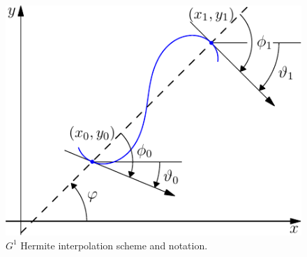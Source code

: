 \documentclass[preprint,3p]{elsarticle}
\begin{document}
\begin{figure}[!tb]
  \begin{center}
    \includegraphics[scale=0.8]{Art_Figure_1}
  \end{center}
  \caption{$G^1$ Hermite interpolation scheme and  notation.}
  \label{fig:interpolation}
\end{figure}
\end{document}
